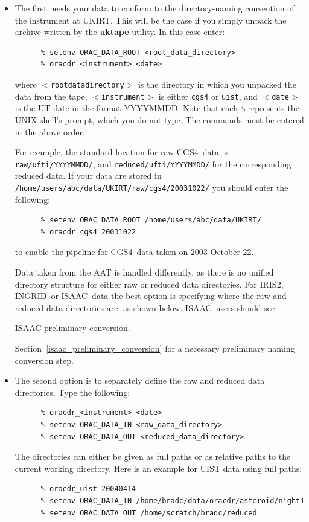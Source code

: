 \documentclass[twoside,11pt]{article}
\newcommand{\htmladdnormallink}[2]{#1}
\newcommand{\htmlref}[2]{#1}
\newenvironment{latexonly}{}{}
\renewcommand{\_}{\texttt{\symbol{95}}}
\newcommand{\INGRID}{\htmladdnormallink{INGRID}{http://www.ing.iac.es/Astronomy/instruments/ingrid/}}
\newcommand{\IRIS}{\htmladdnormallink{IRIS2}{http://www.aao.gov.au/iris2/}}
\newcommand{\ISAAC}{\htmladdnormallink{ISAAC}{http://www.eso.org/instruments/isaac/}}
\newcommand{\CGS}{\htmladdnormallink{CGS4}{http://www.jach.hawaii.edu/JACpublic/UKIRT/instruments/cgs4/cgs4.html}}
\begin{document}
\begin{itemize}

\item The first needs your data to conform to the directory-naming
convention of the instrument at UKIRT. This will be the case if you
simply unpack the archive written by the {\bf uktape} utility.
In this case enter:

\begin{verbatim}
      % setenv ORAC_DATA_ROOT <root_data_directory>
      % oracdr_<instrument> <date>
\end{verbatim}
where {\tt $<$root\_data\_directory$>$} is the directory in which you
unpacked the data from the tape, {\tt $<$instrument$>$} is either
{\tt cgs4} or {\tt uist}, and {\tt$<$date$>$} is the UT date in the
format YYYYMMDD. Note that each \texttt{\%} represents the UNIX shell's
prompt, which you do not type. The commands must be entered in the
above order.

For example, the standard location for raw \CGS\ data is {\tt
raw/ufti/YYYYMMDD/}, and {\tt reduced/ufti/YYYYMMDD/} for the
corresponding reduced data. If your data are stored in
{\tt /home/users/abc/data/UKIRT/raw/cgs4/20031022/} you should enter
the following:

\begin{verbatim}
      % setenv ORAC_DATA_ROOT /home/users/abc/data/UKIRT/
      % oracdr_cgs4 20031022
\end{verbatim}
to enable the pipeline for \CGS\ data taken on 2003 October 22.

Data taken from the AAT is handled differently, as there is no unified
directory structure for either raw or reduced data directories. For
\IRIS, \INGRID\ or \ISAAC\ data the best option is specifying where
the raw and reduced data directories are, as shown below. \ISAAC\ 
users should see
\begin{htmlonly}
\htmlref{ISAAC preliminary conversion.}{isaac_preliminary_conversion}
\end{htmlonly}
\begin{latexonly}
Section~\ref{isaac_preliminary_conversion}
\end{latexonly}
for a necessary preliminary naming conversion step.

\item The second option is to separately define the raw and reduced
data directories. Type the following:

\begin{verbatim}
      % oracdr_<instrument> <date>
      % setenv ORAC_DATA_IN <raw_data_directory>
      % setenv ORAC_DATA_OUT <reduced_data_directory>
\end{verbatim}

The directories can either be given as full paths or as relative
paths to the current working directory. Here is an example for UIST
data using full paths:
\begin{verbatim}
      % oracdr_uist 20040414
      % setenv ORAC_DATA_IN /home/bradc/data/oracdr/asteroid/night1
      % setenv ORAC_DATA_OUT /home/scratch/bradc/reduced
\end{verbatim}

\end{itemize}
\end{document}

